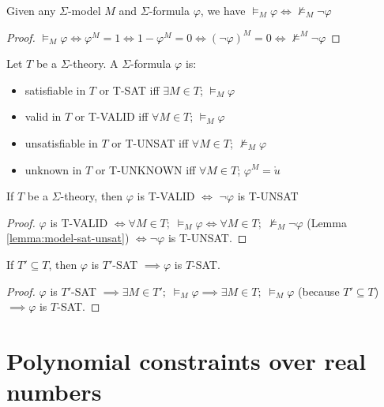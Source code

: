 \begin{lemma}\label{lemma:model-sat-unsat}
Given any $\Sigma$-model $M$ and $\Sigma$-formula $\varphi$, we have $\models_M \varphi \iff \not\models_M \neg \varphi$
\end{lemma}

\begin{proof}
$\models_M \varphi \iff \varphi^M = 1 \iff 1 - \varphi^M = 0 \iff (\neg \varphi)^M = 0 \iff \not\models^M \neg \varphi$
\end{proof}

\begin{definition}
Let $T$ be a $\Sigma$-theory. A $\Sigma$-formula $\varphi$ is:
\begin{itemize}
\item satisfiable in $T$ or T-SAT iff $\exists M \in T$; $\models_{M} \varphi$
\item valid in $T$ or T-VALID iff $\forall M \in T$; $\models_{M} \varphi$
\item unsatisfiable in $T$ or T-UNSAT iff $\forall M \in T$; $\not\models_{M} \varphi$
\item unknown in $T$ or T-UNKNOWN iff $\forall M \in T$; $\varphi^M = \mathring{u}$
\end{itemize}
\end{definition}

\begin{lemma} \label{lemma:theory-valid-unsat}
If $T$ be a $\Sigma$-theory, then $\varphi$ is T-VALID $\iff$ $\neg\varphi$ is T-UNSAT
\end{lemma}

\begin{proof}
$\varphi$ is T-VALID $\iff \forall M \in T; \; \models_{M} \varphi \iff \forall M \in T; \; \not\models_{M} \neg\varphi$ (Lemma \ref{lemma:model-sat-unsat}) $\iff \neg\varphi$ is T-UNSAT.
\end{proof}

\begin{lemma} \label{lemma:subtheory-SAT}
If $T' \subseteq T$, then $\varphi$ is $T'$-SAT $\implies \varphi$ is $T$-SAT.
\end{lemma}

\begin{proof}
$\varphi$ is $T'$-SAT $\implies \exists M \in T'; \; \models_M \varphi \implies \exists M \in T; \; \models_M \varphi$ (because $T' \subseteq T$) $\implies \varphi$ is $T$-SAT.
\end{proof}

\section{Polynomial constraints over real numbers}
